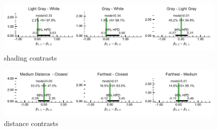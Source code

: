 \begin{figure}
 \includegraphics[width=\textwidth]{./hari-code/factors_shading_contrasts_main-noint.pdf}
 \caption{shading contrasts}
 \label{fig:shading-contrasts-main}
\end{figure}

\begin{figure}
 \includegraphics[width=\textwidth]{./hari-code/factors_distance_contrasts_main-noint.pdf}
 \caption{distance contrasts}
 \label{fig:distance-contrasts-main}
\end{figure}
